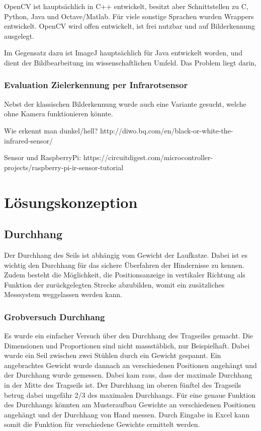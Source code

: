 \documentclass[a4paper]{report}
\begin{document}
OpenCV ist hauptsächlich in C++ entwickelt, besitzt aber Schnittstellen zu C, Python, Java und Octave/Matlab. Für viele sonstige Sprachen wurden Wrappers entwickelt. OpenCV wird offen entwickelt, ist frei nutzbar und auf Bilderkennung ausgelegt.

Im Gegensatz dazu ist ImageJ hauptsächlich für Java entwickelt worden, und dient der Bildbearbeitung im wissenschaftlichen Umfeld. Das Problem liegt darin,

\subsection{Evaluation Zielerkennung per Infrarotsensor}

Nebst der klassischen Bilderkennung wurde auch eine Variante gesucht, welche ohne Kamera funktionieren könnte.

Wie erkennt man dunkel/hell?
http://diwo.bq.com/en/black-or-white-the-infrared-sensor/

Sensor und RaspberryPi:
https://circuitdigest.com/microcontroller-projects/raspberry-pi-ir-sensor-tutorial


\chapter{Lösungskonzeption}
\section{Durchhang}
Der Durchhang des Seils ist abhängig vom Gewicht der Laufkatze. Dabei ist es wichtig den Durchhang für das sichere Überfahren der Hindernisse zu kennen. Zudem besteht die Möglichkeit, die Positionsanzeige in vertikaler Richtung als Funktion der zurückgelegten Strecke abzubilden, womit ein zusätzliches Messsystem weggelassen werden kann.

\subsection{Grobversuch Durchhang}
Es wurde ein einfacher Versuch über den Durchhang des Tragseiles gemacht. Die Dimensionen und Proportionen sind nicht massstäblich, nur Beispielhaft. Dabei wurde ein Seil zwischen zwei Stühlen durch ein Gewicht gespannt. Ein angebrachtes Gewicht wurde dannach an verschiedenen Positionen angehängt und der Durchhang wurde gemessen. Dabei kam raus, dass der maximale Durchhang in der Mitte des Tragseils ist. Der Durchhang im oberen fünftel des Tragseils betrug dabei ungefähr 2/3 des maximalen Durchhangs.
Für eine genaue Funktion des Durchhangs könnten am Musteraufbau Gewichte an verschiedenen Positionen angehängt und der Durchhang von Hand messen. Durch Eingabe in Excel kann somit die Funktion für verschiedene Gewichte ermittelt werden.
\end{document}
